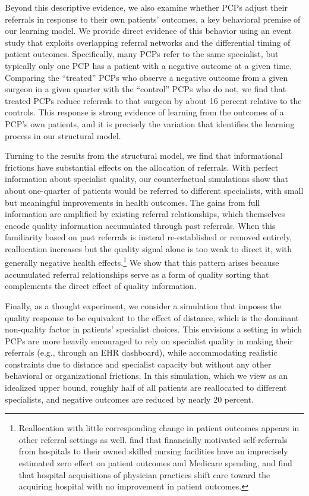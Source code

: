 \documentclass[12pt]{article}
\begin{document}
Beyond this descriptive evidence, we also examine whether PCPs adjust their referrals in response to their own patients' outcomes, a key behavioral premise of our learning model. We provide direct evidence of this behavior using an event study that exploits overlapping referral networks and the differential timing of patient outcomes. Specifically, many PCPs refer to the same specialist, but typically only one PCP has a patient with a negative outcome at a given time. Comparing the ``treated'' PCPs who observe a negative outcome from a given surgeon in a given quarter with the ``control'' PCPs who do not, we find that treated PCPs reduce referrals to that surgeon by about 16 percent relative to the controls. This response is strong evidence of learning from the outcomes of a PCP's own patients, and it is precisely the variation that identifies the learning process in our structural model.

Turning to the results from the structural model, we find that informational frictions have substantial effects on the allocation of referrals. With perfect information about specialist quality, our counterfactual simulations show that about one-quarter of patients would be referred to different specialists, with small but meaningful improvements in health outcomes. The gains from full information are amplified by existing referral relationships, which themselves encode quality information accumulated through past referrals. When this familiarity based on past referrals is instead re-established or removed entirely, reallocation increases but the quality signal alone is too weak to direct it, with generally negative health effects.\footnote{Reallocation with little corresponding change in patient outcomes appears in other referral settings as well. \cite{cutler2026} find that financially motivated self-referrals from hospitals to their owned skilled nursing facilities have an imprecisely estimated zero effect on patient outcomes and Medicare spending, and \cite{lin2025} find that hospital acquisitions of physician practices shift care toward the acquiring hospital with no improvement in patient outcomes.} We show that this pattern arises because accumulated referral relationships serve as a form of quality sorting that complements the direct effect of quality information.

Finally, as a thought experiment, we consider a simulation that imposes the quality response to be equivalent to the effect of distance, which is the dominant non-quality factor in patients' specialist choices. This envisions a setting in which PCPs are more heavily encouraged to rely on specialist quality in making their referrals (e.g., through an EHR dashboard), while accommodating realistic constraints due to distance and specialist capacity but without any other behavioral or organizational frictions. In this simulation, which we view as an idealized upper bound, roughly half of all patients are reallocated to different specialists, and negative outcomes are reduced by nearly 20 percent.
\end{document}
